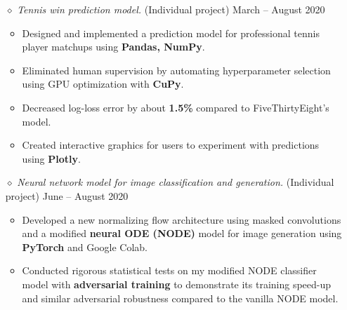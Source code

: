 \documentclass{simplecv}
\begin{document}
\begin{itemize}
  \item[$\diamond$] {\it Tennis win prediction model.} (Individual project) \hfill March -- August 2020 %
  \begin{itemize}
    \item Designed and implemented a prediction model for professional tennis player matchups using {\bf Pandas, NumPy}.
    \item Eliminated human supervision by automating hyperparameter selection using GPU optimization with {\bf CuPy}.
    \item Decreased log-loss error by about {\bf 1.5\%} compared to FiveThirtyEight's model.
    \item Created interactive graphics for users to experiment with predictions using {\bf Plotly}.
  \end{itemize}

  \item[$\diamond$] {\it Neural network model for image classification and generation.} (Individual project) \hfill June -- August 2020 %
  \begin{itemize}
    \item Developed a new normalizing flow architecture using masked convolutions and a modified {\bf neural ODE (NODE)} model for image generation using {\bf PyTorch} and Google Colab.%
    \item Conducted rigorous statistical tests on my modified NODE classifier model with {\bf adversarial training} to demonstrate its training speed-up and similar adversarial robustness compared to the vanilla NODE model.
  \end{itemize}
\end{itemize}
\end{document}
